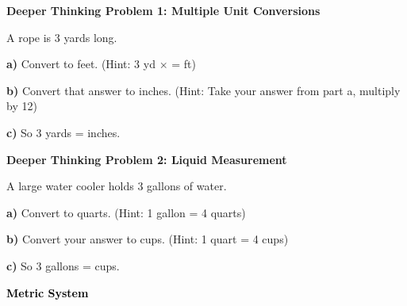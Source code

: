 \documentclass[12pt, letterpaper, fleqn]{article}
\newcommand{\blank}{\underline{\hspace{2.2cm}}}
\begin{document}
\begin{tcolorbox}[colback=white!15, colframe=black, boxrule=1.5pt, arc=4mm, left=6mm, right=6mm, top=5mm, bottom=5mm]

\textbf{Deeper Thinking Problem 1: Multiple Unit Conversions}

\medskip

\noindent
A rope is 3 yards long.

\noindent
\textbf{a)} Convert to feet. (Hint: 3 yd $\times$ \blank = \blank ft)

\vspace{2cm}

\noindent
\textbf{b)} Convert that answer to inches. (Hint: Take your answer from part a, multiply by 12)

\vspace{2cm}

\noindent
\textbf{c)} So 3 yards = \blank inches.

\vspace{2cm}

\end{tcolorbox}
\begin{tcolorbox}[colback=white!15, colframe=black, boxrule=1.5pt, arc=4mm, left=6mm, right=6mm, top=5mm, bottom=5mm]
\textbf{Deeper Thinking Problem 2: Liquid Measurement}
\medskip
\noindent

A large water cooler holds 3 gallons of water.
\noindent 
\vspace{1cm}

\textbf{a)} Convert to quarts. (Hint: 1 gallon = 4 quarts)
\vspace{2cm}

\noindent
\textbf{b)} Convert your answer to cups. (Hint: 1 quart = 4 cups)
\vspace{2cm}

\noindent
\textbf{c)} So 3 gallons = \underline{\hspace{1.5cm}} cups.
\vspace{1cm}

\end{tcolorbox}

\newpage

\begin{tcolorbox}[colback=customteal!20]
\large\textcolor{black}{\textbf{Metric System}}
\end{tcolorbox}
\end{document}
